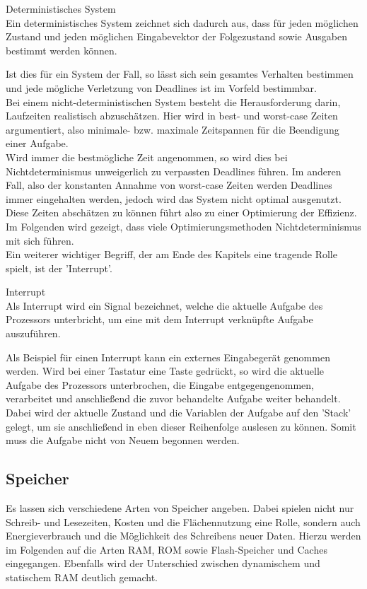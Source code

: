 \begin{definition}{Deterministisches System}\\
Ein deterministisches System zeichnet sich dadurch aus, dass für jeden möglichen Zustand und jeden möglichen Eingabevektor der Folgezustand sowie Ausgaben bestimmt werden können.
\end{definition}
Ist dies für ein System der Fall, so lässt sich sein gesamtes Verhalten bestimmen und jede mögliche Verletzung von Deadlines ist im Vorfeld bestimmbar.\\
Bei einem nicht-deterministischen System besteht die Herausforderung darin, Laufzeiten realistisch abzuschätzen. Hier wird in best- und worst-case Zeiten argumentiert, also minimale- bzw. maximale Zeitspannen für die Beendigung einer Aufgabe.\\
Wird immer die bestmögliche Zeit angenommen, so wird dies bei Nichtdeterminismus unweigerlich zu verpassten Deadlines führen. Im anderen Fall, also der konstanten Annahme von worst-case Zeiten werden Deadlines immer eingehalten werden, jedoch wird das System nicht optimal ausgenutzt. Diese Zeiten abschätzen zu können führt also zu einer Optimierung der Effizienz.\\
Im Folgenden wird gezeigt, dass viele Optimierungsmethoden Nichtdeterminismus mit sich führen.\\
Ein weiterer wichtiger Begriff, der am Ende des Kapitels eine tragende Rolle spielt, ist der 'Interrupt'.
\begin{definition}{Interrupt}\\
Als Interrupt wird ein Signal bezeichnet, welche die aktuelle Aufgabe des Prozessors unterbricht, um eine mit dem Interrupt verknüpfte Aufgabe auszuführen.
\end{definition}
Als Beispiel für einen Interrupt kann ein externes Eingabegerät genommen werden. Wird bei einer Tastatur eine Taste gedrückt, so wird die aktuelle Aufgabe des Prozessors unterbrochen, die Eingabe entgegengenommen, verarbeitet und anschließend die zuvor behandelte Aufgabe weiter behandelt. Dabei wird der aktuelle Zustand und die Variablen der Aufgabe auf den 'Stack' gelegt, um sie anschließend in eben dieser Reihenfolge auslesen zu können. Somit muss die Aufgabe nicht von Neuem begonnen werden.
\subsection{Speicher}\label{2.2}
Es lassen sich verschiedene Arten von Speicher angeben. Dabei spielen nicht nur Schreib- und Lesezeiten, Kosten und die Flächennutzung eine Rolle, sondern auch Energieverbrauch und die Möglichkeit des Schreibens neuer Daten. Hierzu werden im Folgenden auf die Arten RAM, ROM sowie Flash-Speicher und Caches eingegangen. Ebenfalls wird der Unterschied zwischen dynamischem und statischem RAM deutlich gemacht.

